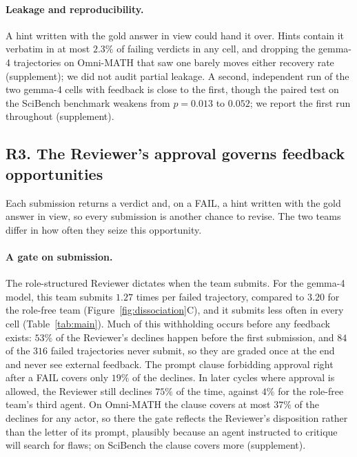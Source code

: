 \paragraph{Leakage and reproducibility.} A hint written with the gold
answer in view could hand it over. Hints contain it verbatim in at most
$2.3\%$ of failing verdicts in any cell, and dropping the gemma-4
trajectories on Omni-MATH that saw one barely moves either recovery rate
(supplement); we did not audit partial leakage. A second, independent run of the two gemma-4 cells with feedback
is close to the first, though the paired test on the SciBench benchmark
weakens from $p=0.013$ to $0.052$; we report the first run throughout
(supplement).

\subsection{R3. The Reviewer's approval governs feedback opportunities}
\label{subsec:mechanism}

Each submission returns a verdict and, on a FAIL, a hint written with the
gold answer in view, so every submission is another chance to revise. The
two teams differ in how often they seize this opportunity.

\paragraph{A gate on submission.} The role-structured Reviewer dictates when
the team submits. For the gemma-4 model, this team submits $1.27$ times per
failed trajectory, compared to $3.20$ for the role-free team
(Figure~\ref{fig:dissociation}C), and it submits less often in every cell
(Table~\ref{tab:main}). Much of this withholding occurs before any feedback
exists: $53\%$ of the Reviewer's declines happen before the first
submission, and $84$ of the $316$ failed trajectories never submit, so they
are graded once at the end and never see external feedback. The prompt
clause forbidding approval right after a FAIL covers only $19\%$ of the
declines. In later cycles where approval is allowed, the Reviewer still
declines $75\%$ of the time, against $4\%$ for the role-free team's third
agent. On Omni-MATH the clause covers at most $37\%$ of the declines for
any actor, so there the gate reflects the Reviewer's disposition rather
than the letter of its prompt, plausibly because an agent instructed to
critique will search for flaws; on SciBench the clause covers more
(supplement).

